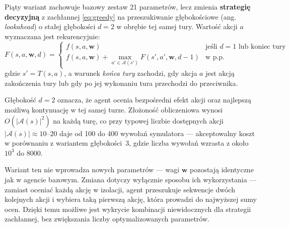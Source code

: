 Piąty wariant zachowuje bazowy zestaw 21 parametrów, lecz zmienia \textbf{strategię decyzyjną} z zachłannej \eqref{eq:greedy} na przeszukiwanie głębokościowe (ang. \textit{lookahead}) o stałej głębokości $d = 2$ w obrębie tej samej tury. Wartość akcji $a$ wyznaczana jest rekurencyjnie:
\begin{equation}
    F(s, a, \mathbf{w}, d) =
    \begin{cases}
        f(s, a, \mathbf{w}) & \text{jeśli } d = 1 \text{ lub koniec tury} \\
        f(s, a, \mathbf{w}) +
        \displaystyle\max_{a' \in \mathcal{A}(s')}
            F(s', a', \mathbf{w}, d-1)
        & \text{w p.p.}
    \end{cases}
    \label{eq:lookahead}
\end{equation}
gdzie $s' = T(s, a)$, a warunek \emph{końca tury} zachodzi, gdy akcja $a$ jest akcją zakończenia tury lub gdy po jej wykonaniu tura przechodzi do przeciwnika.

Głębokość $d = 2$ oznacza, że agent ocenia bezpośredni efekt akcji oraz najlepszą możliwą kontynuację w tej samej turze. Złożoność obliczeniowa wynosi $O(|\mathcal{A}(s)|^2)$ na każdą turę, co przy typowej liczbie dostępnych akcji $|\mathcal{A}(s)| \approx 10$--$20$ daje od 100 do 400 wywołań symulatora --- akceptowalny koszt w porównaniu z wariantem głębokości~3, gdzie liczba wywołań wzrasta z około $10^3$ do $8 000$.

Wariant ten nie wprowadza nowych parametrów --- wagi $\mathbf{w}$ pozostają identyczne jak w agencie bazowym. Zmiana dotyczy wyłącznie sposobu ich wykorzystania --- zamiast oceniać każdą akcję w izolacji, agent przeszukuje sekwencje dwóch kolejnych akcji i wybiera taką pierwszą akcję, która prowadzi do najwyższej sumy ocen. Dzięki temu możliwe jest wykrycie kombinacji niewidocznych dla strategii zachłannej, bez zwiększania liczby optymalizowanych parametrów.
